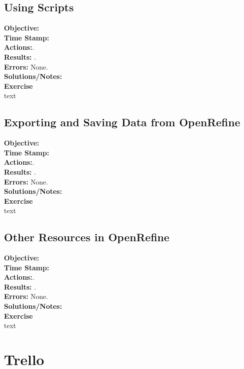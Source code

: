\documentclass{article}
\begin{document}
\begin{FlushLeft}
\subsection{Using Scripts}
\textbf{Objective: }\\ 
\textbf{Time Stamp:} \\
\textbf{Actions:}.\\
\textbf{Results:} . \\
\textbf{Errors:} None.\\
\textbf{Solutions/Notes:}\\
\vspace{5mm}
\textbf{Exercise}\\ 
text\\
\vspace{5mm}

\subsection{Exporting and Saving Data from OpenRefine}
\textbf{Objective: }\\ 
\textbf{Time Stamp:} \\
\textbf{Actions:}.\\
\textbf{Results:} . \\
\textbf{Errors:} None.\\
\textbf{Solutions/Notes:}\\
\vspace{5mm}
\textbf{Exercise}\\ 
text\\
\vspace{5mm}

\subsection{Other Resources in OpenRefine}
\textbf{Objective: }\\ 
\textbf{Time Stamp:} \\
\textbf{Actions:}.\\
\textbf{Results:} . \\
\textbf{Errors:} None.\\
\textbf{Solutions/Notes:}\\
\vspace{5mm}
\textbf{Exercise}\\ 
text\\
\vspace{5mm}

\pagebreak

\section{Trello}

\end{FlushLeft}
\end{document}
